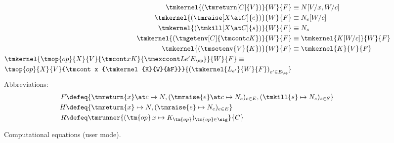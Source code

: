 \begin{figure}[tbp]
{\begin{align*}
{{    }}
  \\
    \tmkernel{(\tmreturn[C]{V})}{W}{F} &\equiv N[V/x, W/c] \\
    \tmkernel{(\tmraise[X \at C]{e})}{W}{F} &\equiv N_{e}[W/c] \\
    \tmkernel{(\tmkill[X \at C]{s})}{W}{F} &\equiv N_{s} \\
    \tmkernel{(\tmgetenv[C]{\tmcont c K})}{W}{F} &\equiv \tmkernel{K[W/c]}{W}{F} \\
    \tmkernel{(\tmsetenv{V}{K})}{W}{F} &\equiv \tmkernel{K}{V}{F}
    \\
    \omit\rlap{$
       \tmkernel{\tmop{op}{X}{V}{\tmcont x K}{\tmexccont L {e'} {E_\op}}}{W}{F}
      \equiv $}
    \\
      \tmop{op}{X}{V}{\tmcont x {\tmkernel{K}{W}{&F}}}{
      \left(
         \tmkernel{L_{e'}}{W}{F}
      \right)_{e' \in E_\op}}
  \end{align*}
  Abbreviations:
  \begin{align*}
    F &\defeq
       \{ \tmreturn{x} \at c \mapsto N,
       (\tmraise{e} \at c \mapsto N_e)_{e \in E},
       (\tmkill{s} \mapsto N_s)_{s \in S}
       \}
    \\
    H &\defeq
       \{ \tmreturn{x} \mapsto N,
          (\tmraise{e} \mapsto N_e)_{e \in E}
       \}
    \\
    R &\defeq \tmrunner{(\tm{op}\,x \mapsto K_{\tm{op}})_{\tm{op} \in \sig}}{C}
  \end{align*}
  } %
  \caption{Computational equations (user mode).}
  \label{fig:computational-equations-user}
\end{figure}

